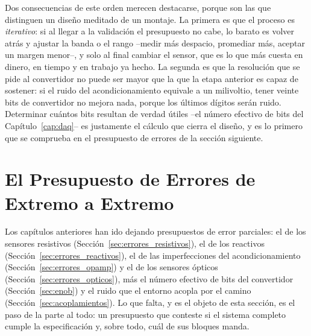 Dos consecuencias de este orden merecen destacarse, porque son las que distinguen un diseño meditado de un montaje. La primera es que el proceso es \emph{iterativo}: si al llegar a la validación el presupuesto no cabe, lo barato es volver atrás y ajustar la banda o el rango --medir más despacio, promediar más, aceptar un margen menor--, y solo al final cambiar el sensor, que es lo que más cuesta en dinero, en tiempo y en trabajo ya hecho. La segunda es que la resolución que se pide al convertidor no puede ser mayor que la que la etapa anterior es capaz de sostener: si el ruido del acondicionamiento equivale a un milivoltio, tener veinte bits de convertidor no mejora nada, porque los últimos dígitos serán ruido. Determinar cuántos bits resultan de verdad útiles --el número efectivo de bits del Capítulo~\ref{cap:daq}-- es justamente el cálculo que cierra el diseño, y es lo primero que se comprueba en el presupuesto de errores de la sección siguiente.


\section{El Presupuesto de Errores de Extremo a Extremo}\label{sec:presupuesto_global}

Los capítulos anteriores han ido dejando presupuestos de error parciales: el de los sensores resistivos (Sección~\ref{sec:errores_resistivos}), el de los reactivos (Sección~\ref{sec:errores_reactivos}), el de las imperfecciones del acondicionamiento (Sección~\ref{sec:errores_opamp}) y el de los sensores ópticos (Sección~\ref{sec:errores_opticos}), más el número efectivo de bits del convertidor (Sección~\ref{sec:enob}) y el ruido que el entorno acopla por el camino (Sección~\ref{sec:acoplamientos}). Lo que falta, y es el objeto de esta sección, es el paso de la parte al todo: un presupuesto que conteste si el sistema completo cumple la especificación y, sobre todo, cuál de sus bloques manda.


